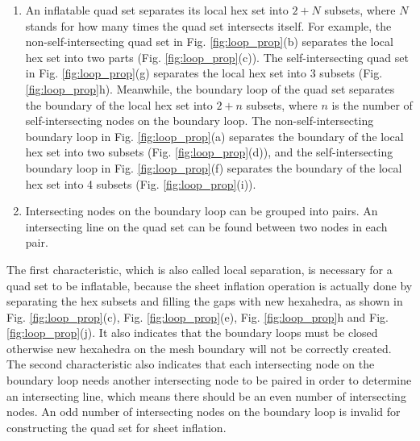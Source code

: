 \documentclass[final,5p,times,twocolumn]{elsarticle}
\begin{document}
\begin{enumerate}
\item An inflatable quad set separates its local hex set into $2+N$ subsets, where $N$ stands for how many times the quad set intersects itself. For example, the non-self-intersecting quad set in Fig. \ref{fig:loop_prop}(b) separates the local hex set into two parts (Fig. \ref{fig:loop_prop}(c)). The self-intersecting quad set in Fig. \ref{fig:loop_prop}(g) separates the local hex set into 3 subsets (Fig. \ref{fig:loop_prop}h). Meanwhile, the boundary loop of the quad set separates the boundary of the local hex set into $2+n$ subsets, where $n$ is the number of self-intersecting nodes on the boundary loop. The non-self-intersecting boundary loop in Fig. \ref{fig:loop_prop}(a) separates the boundary of the local hex set into two subsets (Fig. \ref{fig:loop_prop}(d)), and the self-intersecting boundary loop in Fig. \ref{fig:loop_prop}(f) separates the boundary of the local hex set into 4 subsets (Fig. \ref{fig:loop_prop}(i)).

\item Intersecting nodes on the boundary loop can be grouped into pairs. An intersecting line on the quad set can be found between two nodes in each pair.
\end{enumerate}

The first characteristic, which is also called local separation, is necessary for a quad set to be inflatable, because the sheet inflation operation is actually done by separating the hex subsets and filling the gaps with new hexahedra, as shown in Fig. \ref{fig:loop_prop}(c), Fig. \ref{fig:loop_prop}(e), Fig. \ref{fig:loop_prop}h and Fig. \ref{fig:loop_prop}(j). It also indicates that the boundary loops must be closed otherwise new hexahedra on the mesh boundary will not be correctly created. The second characteristic also indicates that each intersecting node on the boundary loop needs another intersecting node to be paired in order to determine an intersecting line, which means there should be an even number of intersecting nodes. An odd number of intersecting nodes on the boundary loop is invalid for constructing the quad set for sheet inflation.
\end{document}
